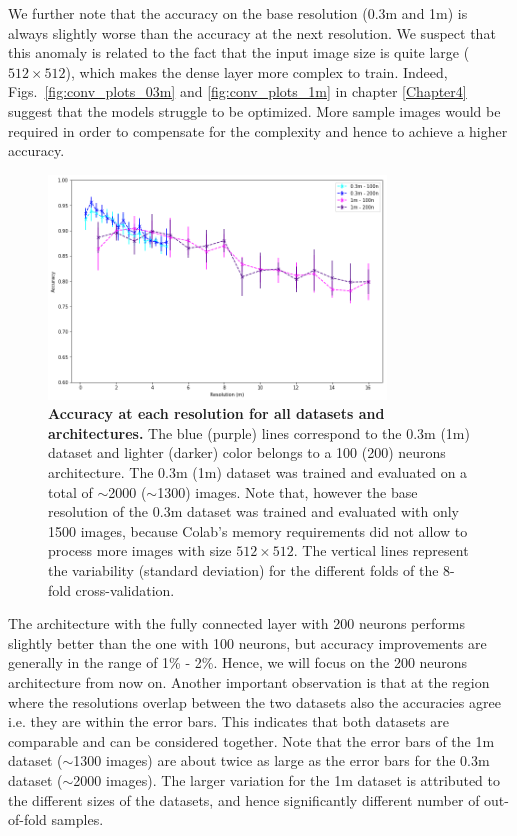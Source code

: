 We further note that the accuracy on the base resolution (0.3m and 1m) is always slightly worse than the accuracy at the next resolution. We suspect that this anomaly is related to the fact that the input image size is quite large ($512\times512$), which makes the dense layer more complex to train. Indeed, Figs.~\ref{fig:conv_plots_03m} and \ref{fig:conv_plots_1m} in chapter \ref{Chapter4} suggest that the models struggle to be optimized. More sample images would be required in order to compensate for the complexity and hence to achieve a higher accuracy.

\begin{figure}[h!]
	\centering
	\includegraphics[width=0.8\textwidth]{Figures/results/acc_res_03m_1m.png}
	\captionsetup{width=1\linewidth}
	\caption{\textbf{Accuracy at each resolution for all datasets and architectures.} The blue (purple) lines correspond to the 0.3m (1m) dataset and lighter (darker) color belongs to a 100 (200) neurons architecture. The 0.3m (1m) dataset was trained and evaluated on a total of $\sim$2000 ($\sim$1300) images. Note that, however the base resolution of the 0.3m dataset was trained and evaluated with only 1500 images, because Colab's memory requirements did not allow to process more images with size $512\times512$. The vertical lines represent the variability (standard deviation) for the different folds of the 8-fold cross-validation.}
	\label{fig:acc_res_03m_1m}
\end{figure}

The architecture with the fully connected layer with 200 neurons performs slightly better than the one with 100 neurons, but accuracy improvements are generally in the range of 1\% - 2\%. Hence, we will focus on the 200 neurons architecture from now on. Another important observation is that at the region where the resolutions overlap between the two datasets also the accuracies agree i.e. they are within the error bars. This indicates that both datasets are comparable and can be considered together.
Note that the error bars of the 1m dataset ($\sim$1300 images) are about twice as large as the error bars for the 0.3m dataset ($\sim$2000 images). The larger variation for the 1m dataset is attributed to the different sizes of the datasets, and hence significantly different number of out-of-fold samples.


